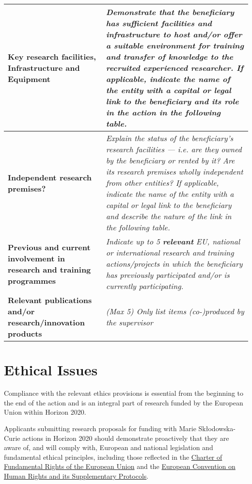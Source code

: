 \begin{table}[h!]
{\begin{tabular}{|>{\raggedright}p{}|p{}|}
\\\hline
\textbf{Key research facilities, Infrastructure and Equipment} &
{\em Demonstrate that the beneficiary has sufficient facilities and
infrastructure to host and/or offer a suitable environment for
training and transfer of knowledge to the recruited
experienced researcher.
\newline
If applicable, indicate the name of the entity with a capital or
legal link to the beneficiary and its role in the action in the
following table.}
\\\hline
\textbf{Independent research premises?} &
{\em Explain the status of the beneficiary's research facilities \---- i.e.
are they owned by the beneficiary or rented by it? Are its
research premises wholly independent from other entities?
\newline
If applicable, indicate the name of the entity with a capital or
legal link to the beneficiary and describe the nature of the
link in the following table.}
\\\hline
\textbf{Previous and current involvement in research and training programmes} &
{\em Indicate up to 5 \textbf{relevant} EU, national or international
research and training actions/projects in which the
beneficiary has previously participated and/or is currently
participating.}
\\\hline
\textbf{Relevant publications and/or research/innovation products} &
{\em (Max 5) Only list items (co-)produced by the supervisor}
\\\hline
\end{tabular}}
\end{table}




\newpage
\section{Ethical Issues}
\label{sec:ethics}

Compliance with the relevant ethics provisions is essential from the beginning to the end of
the action and is an integral part of research funded by the European Union within Horizon 2020. 

\medskip\noindent
Applicants submitting research proposals for funding with Marie Sk\l{}odowska-Curie actions in
Horizon 2020 should demonstrate proactively that they are aware of, and will comply with, European
and national legislation and fundamental ethical principles, including those reflected in the 
\href{http://www.europarl.europa.eu/charter/pdf/text_en.pdf}{Charter of Fundamental Rights of the European Union}
and the \href{http://www.echr.coe.int/Documents/Convention_ENG.pdf}{European Convention on Human Rights and its Supplementary Protocols}.

